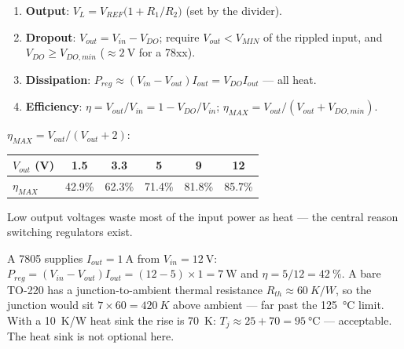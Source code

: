 \documentclass[11pt,a4paper,oneside]{book}
\begin{document}
\begin{protocol}
\begin{enumerate}[leftmargin=1.5cm]
  \item \textbf{Output}: $V_L=V_{REF}\bigl(1+R_1/R_2\bigr)$ (set by the divider).
  \item \textbf{Dropout}: $V_{out}=V_{in}-V_{DO}$; require $V_{out}<V_{MIN}$ of
        the rippled input, and $V_{DO}\ge V_{DO,min}$ ($\approx\qty{2}{\volt}$ for
        a 78xx).
  \item \textbf{Dissipation}: $P_{reg}\approx(V_{in}-V_{out})I_{out}=V_{DO}I_{out}$
        --- all heat.
  \item \textbf{Efficiency}: $\eta=V_{out}/V_{in}=1-V_{DO}/V_{in}$;
        $\eta_{MAX}=V_{out}/(V_{out}+V_{DO,min})$.
\end{enumerate}
\end{protocol}

\begin{wexample}[Efficiency of a 78xx ($V_{DO,min}=\qty{2}{\volt}$)]
$\eta_{MAX}=V_{out}/(V_{out}+2)$:
\begin{center}\small
\begin{tabular}{@{}lccccc@{}}
\toprule
$V_{out}$ (V) & 1.5 & 3.3 & 5 & 9 & 12\\
\midrule
$\eta_{MAX}$ & 42.9\% & 62.3\% & 71.4\% & 81.8\% & 85.7\%\\
\bottomrule
\end{tabular}
\end{center}
Low output voltages waste most of the input power as heat --- the central reason
switching regulators exist.
\end{wexample}

\begin{wexample}
A 7805 supplies $I_{out}=\qty{1}{\ampere}$ from $V_{in}=\qty{12}{\volt}$:
$P_{reg}=(V_{in}-V_{out})I_{out}=(12-5)\times1=\qty{7}{\watt}$ and
$\eta=5/12=\qty{42}{\percent}$. A bare TO-220 has a junction-to-ambient thermal
resistance $R_{th}\approx\qty{60}{K/W}$, so the junction would sit
$7\times60=\qty{420}{K}$ above ambient --- far past the \qty{125}{\celsius}
limit. With a \qty{10}{K/W} heat sink the rise is \qty{70}{K}:
$T_j\approx25+70=\qty{95}{\celsius}$ --- acceptable. The heat sink is not
optional here.
\end{wexample}
\end{document}
